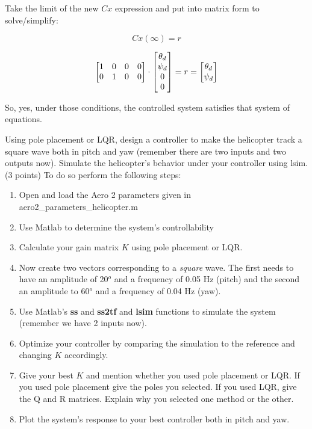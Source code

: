 \documentclass[11pt]{article}
\begin{document}
Take the limit of the new $Cx$ expression and put into matrix form to solve/simplify:

\[Cx(\infty) = r\]

\[\begin{bmatrix}
    $1$ & $0$ & $0$ & $0$\\
    $0$ & $1$ & $0$ & $0$\end{bmatrix}\cdot\begin{bmatrix}
        \theta_d\\
        \psi_d\\
        $0$\\
        $0$
    \end{bmatrix}=r=\begin{bmatrix}
        \theta_d\\
        \psi_d
    \end{bmatrix}\]

So, yes, under those conditions, the controlled system satisfies that system of equations.

\newpage
\textcolor{blue}{}
\medskip

Using pole placement or LQR, design a controller to make the helicopter track a square wave both in pitch and yaw (remember there are two inputs and two outputs now). Simulate the helicopter's behavior under your controller using lsim. (3 points) To do so perform the following steps:

\medskip

\begin{enumerate}

    \item Open and load the Aero 2 parameters given in aero2\_parameters\_helicopter.m
     \item Use Matlab to determine the system's controllability
     
    \item Calculate your gain matrix $K$ using pole placement or LQR.
    
    \item Now create two vectors corresponding to a \textit{square} wave. The first needs to have an amplitude of  20$^o$ and a frequency of 0.05 Hz (pitch) and the second an amplitude to 60$^o$ and a frequency of 0.04 Hz (yaw).

        \item Use Matlab's \textbf{ss} and \textbf{ss2tf} and  \textbf{lsim} functions to simulate the system (remember we have 2 inputs now). 
   

    \item Optimize your controller by comparing the simulation to the reference and changing $K$ accordingly.
    \item Give your best $K$ and mention whether you used pole placement or LQR. If you used pole placement give the poles you selected. If you used LQR, give the Q and R matrices. Explain why you selected one method or the other.
    \item Plot the system's response to your best controller both in pitch and yaw.

\end{enumerate}
\end{document}

